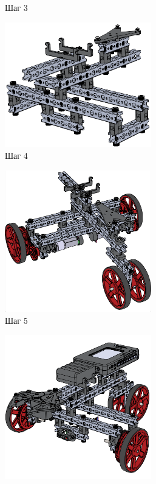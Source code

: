 \begin{figure}[h]
\begin{subfigure}[b]{0.45\textwidth}
        \caption*{Шаг 3}
    \end{subfigure}
    \begin{subfigure}[b]{0.45\textwidth}
        \centering
        \includegraphics[width=0.7\textwidth]{fig/assembly/1.4.png}
        \caption*{Шаг 4}
    \end{subfigure}
    \begin{subfigure}[b]{0.45\textwidth}
        \centering
        \includegraphics[width=0.7\textwidth]{fig/assembly/1.5.png}
        \caption*{Шаг 5}
    \end{subfigure}
    \begin{subfigure}[b]{0.45\textwidth}
        \flushright
        \includegraphics[width=0.7\textwidth]{fig/assembly/1.6.png}

\end{subfigure}
\end{figure}
